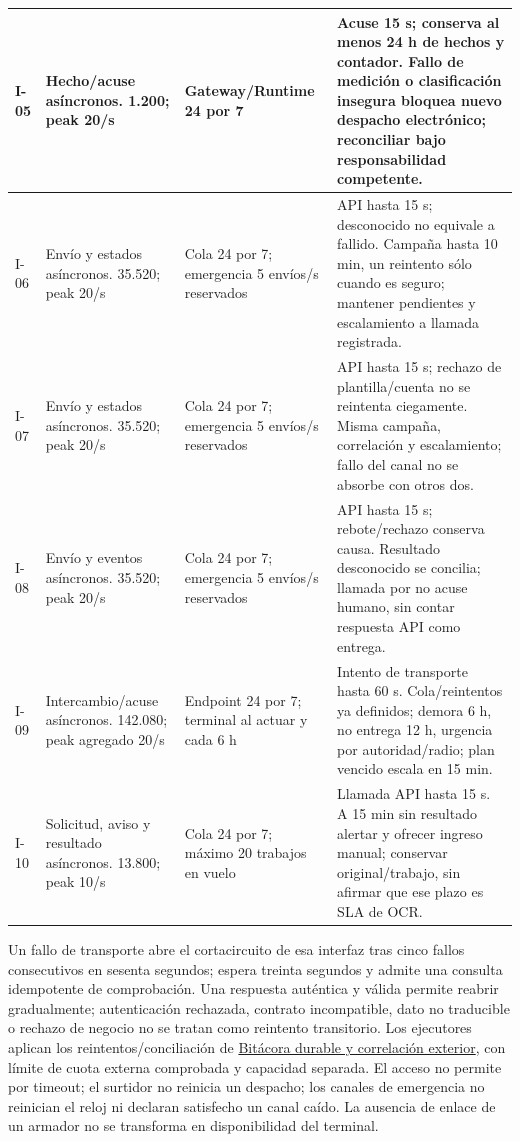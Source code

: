 \begin{longtable}{@{}L{.11\linewidth}L{.26\linewidth}L{.22\linewidth}L{\dimexpr.41\tabcolsep\relax}@{}}
I-05 & Hecho/acuse asíncronos. 1.200; peak 20/s & Gateway/Runtime 24 por 7 & Acuse 15 s; conserva al menos 24 h de hechos y contador. Fallo de medición o clasificación insegura bloquea nuevo despacho electrónico; reconciliar bajo responsabilidad competente.\\ \hline
I-06 & Envío y estados asíncronos. 35.520; peak 20/s & Cola 24 por 7; emergencia 5 envíos/s reservados & API hasta 15 s; desconocido no equivale a fallido. Campaña hasta 10 min, un reintento sólo cuando es seguro; mantener pendientes y escalamiento a llamada registrada.\\ \hline
I-07 & Envío y estados asíncronos. 35.520; peak 20/s & Cola 24 por 7; emergencia 5 envíos/s reservados & API hasta 15 s; rechazo de plantilla/cuenta no se reintenta ciegamente. Misma campaña, correlación y escalamiento; fallo del canal no se absorbe con otros dos.\\ \hline
I-08 & Envío y eventos asíncronos. 35.520; peak 20/s & Cola 24 por 7; emergencia 5 envíos/s reservados & API hasta 15 s; rebote/rechazo conserva causa. Resultado desconocido se concilia; llamada por no acuse humano, sin contar respuesta API como entrega.\\ \hline
I-09 & Intercambio/acuse asíncronos. 142.080; peak agregado 20/s & Endpoint 24 por 7; terminal al actuar y cada 6 h & Intento de transporte hasta 60 s. Cola/reintentos ya definidos; demora 6 h, no entrega 12 h, urgencia por autoridad/radio; plan vencido escala en 15 min.\\ \hline
I-10 & Solicitud, aviso y resultado asíncronos. 13.800; peak 10/s & Cola 24 por 7; máximo 20 trabajos en vuelo & Llamada API hasta 15 s. A 15 min sin resultado alertar y ofrecer ingreso manual; conservar original/trabajo, sin afirmar que ese plazo es SLA de OCR.\\ \hline
\end{longtable}

Un fallo de transporte abre el cortacircuito de esa interfaz tras cinco fallos consecutivos en sesenta segundos; espera treinta segundos y admite una consulta idempotente de comprobación. Una respuesta auténtica y válida permite reabrir gradualmente; autenticación rechazada, contrato incompatible, dato no traducible o rechazo de negocio no se tratan como reintento transitorio. Los ejecutores aplican los reintentos/conciliación de \hyperref[sec:a42-correlacion]{Bitácora durable y correlación exterior}, con límite de cuota externa comprobada y capacidad separada. El acceso no permite por timeout; el surtidor no reinicia un despacho; los canales de emergencia no reinician el reloj ni declaran satisfecho un canal caído. La ausencia de enlace de un armador no se transforma en disponibilidad del terminal.

